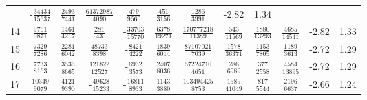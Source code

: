 \documentclass[letterpaper,11pt,nointlimits,reqno,draft]{amsbook}
\begin{document}
\begin{table}
\begin{tabular}{r|ccccccccc|c@{ -- }c@{\%}}
& -$\frac{           34434}{           15637}$
&  $\frac{            2493}{            7441}$
&  $\frac{        61372987}{            4090}$
&  $\frac{             479}{            9560}$
&  $\frac{             451}{            3156}$
&  $\frac{            1286}{            3991}$
&  -2.82 &  1.34
\\
14
&  $\frac{            9761}{            9871}$
&  $\frac{            1461}{            4217}$
&  $\frac{             281}{              43}$
& -$\frac{           33703}{           15770}$
&  $\frac{            6378}{           19271}$
&  $\frac{       170777218}{           11389}$
&  $\frac{             543}{           11569}$
&  $\frac{            1880}{           13293}$
&  $\frac{            4685}{           14541}$
&  -2.82 &  1.33
\\
15
&  $\frac{            7329}{            7286}$
&  $\frac{            2281}{            6042}$
&  $\frac{           48733}{            8398}$
& -$\frac{            8421}{            4222}$
&  $\frac{            1839}{            6014}$
&  $\frac{        87107021}{            7039}$
&  $\frac{            1578}{           36371}$
&  $\frac{            1153}{            7805}$
&  $\frac{            1189}{            3613}$
&  -2.72 &  1.29
\\
16
&  $\frac{            7733}{            8163}$
&  $\frac{            3533}{            8665}$
&  $\frac{          121822}{           12527}$
& -$\frac{            6932}{            3573}$
&  $\frac{            2407}{            8036}$
&  $\frac{        57224710}{            4651}$
&  $\frac{             286}{            6989}$
&  $\frac{             377}{            2558}$
&  $\frac{            4584}{           13895}$
&  -2.72 &  1.29
\\
17
&  $\frac{           10349}{            9079}$
&  $\frac{            4121}{            9390}$
& -$\frac{           49628}{           15233}$
& -$\frac{           16811}{            8933}$
&  $\frac{            1143}{            3880}$
&  $\frac{       103494425}{            8753}$
&  $\frac{            1589}{           41049}$
&  $\frac{             817}{            5544}$
&  $\frac{            2196}{            6637}$
&  -2.66 &  1.24
\\ \hline
\end{tabular}
\end{table}
\end{document}

